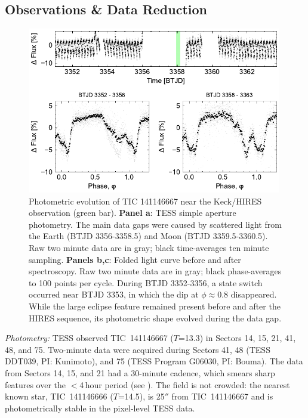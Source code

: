 \documentclass{nature3}
\begin{document}
\newpage
\begin{methods}

\renewcommand{\figurename}{Extended Data Figure}
\renewcommand{\tablename}{Extended Data Table}
\setcounter{table}{0}  
\setcounter{figure}{0}  

\subsection{Observations \& Data Reduction}\phantom{+}

\begin{figure}[!b]
  \centering
  \includegraphics[width=0.99\textwidth]{figures/sf1.pdf}
  \caption{Photometric evolution of TIC 141146667 near the Keck/HIRES observation (green bar). 
  {\bf Panel a}: TESS simple aperture photometry. 
  The main data gaps were caused by scattered light from the Earth
  (BTJD 3356-3358.5) and Moon (BTJD 3359.5-3360.5).
  Raw two minute data are in gray; black time-averages ten minute
  sampling.
  {\bf Panels b,c}: Folded light curve before and after spectroscopy.
  Raw two minute data are in gray; black phase-averages to 100 points
  per cycle.
  During BTJD 3352-3356, a state switch occurred near BTJD 3353,
  in which the dip at $\phi$$\approx$0.8 disappeared.
  While the large eclipse feature remained present before and after
  the HIRES sequence, its photometric shape evolved during the data
  gap.
  }
  \label{fig:fulllc}
\end{figure}

{\it Photometry:} TESS observed TIC~141146667 ($T$=13.3) in Sectors 14,
15, 21, 41, 48, and 75.  Two-minute data were acquired during Sectors
41, 48 (TESS DDT039, PI: Kunimoto), and 75 (TESS Program G06030, PI:
Bouma).  The data from Sectors 14, 15, and 21 had a 30-minute cadence,
which smears sharp features over the $<$4\,hour period (see
\cite{Gunther2022}).  The field is not crowded:  the nearest known
star, TIC~141146666 ($T$=14.5), is 25$''$ from TIC~141146667 and is
photometrically stable in the pixel-level TESS data.


\end{methods}
\end{document}
